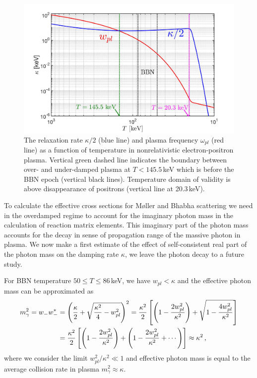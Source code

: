 \begin{figure} 
\centerline{\includegraphics[width=0.9\linewidth]{./plots/KappaElectronPhotonMass_Talk}}
\caption{The relaxation rate $\kappa/2$ (blue line) and plasma frequency $\omega_{pl}$ (red line) as a function of temperature in nonrelativistic electron-positron plasma. Vertical green dashed line indicates the boundary between over- and under-damped plasma at $T<145.5$\,keV which is before the BBN epoch (vertical black lines). Temperature domain of validity is above disappearance of positrons (vertical line at 20.3\,keV). }
\label{RelaxationRate002:fig} 
\end{figure}

To calculate the effective cross sections for M{\o}ller and Bhabha scattering we need in the overdamped regime to account for the imaginary photon mass in the calculation of reaction matrix elements. This imaginary part of the photon mass accounts for the decay in sense of propagation range of the massive photon in plasma. We now make a first estimate of the effect of self-consistent real part of the photon mass on the damping rate $\kappa$, we leave the photon decay to a future study.

For BBN temperature $50\leqslant T\leqslant 86$\,keV,
we have $w_{pl}<\kappa$ and the effective photon mass can be approximated as
\begin{align}
m^2_\gamma=w_-w_-^\ast&=\left(\frac{\kappa}{2}+\sqrt{\frac{\kappa^2}{4}-w^2_{pl}}\right)^2
=\frac{\kappa^2}{2}\left[\left(1-\frac{2w^2_{pl}}{\kappa^2}\right)+\sqrt{1-\frac{4w^2_{pl}}{\kappa^2}}\right]\notag\\
&=\frac{\kappa^2}{2}\left[\left(1-\frac{2w^2_{pl}}{\kappa^2}\right)+\left(1-\frac{2w^2_{pl}}{\kappa^2}+\cdots\right)\right]\approx\kappa^2\,,
\label{PhotonMassPlasma002}
\end{align}
where we consider the limit $w^2_{pl}/\kappa^2\ll 1$ and effective photon mass is equal to the average collision rate in plasma $m^2_\gamma\approx\kappa$.

